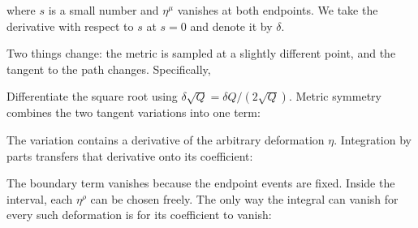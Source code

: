 \documentclass[
  11pt,
  letterpaper,
  oneside,
  openany]{scrbook}
\begin{document}
where \(s\) is a small number and \(\eta^\mu\) vanishes at both
endpoints. We take the derivative with respect to \(s\) at \(s=0\) and
denote it by \(\delta\).

Two things change: the metric is sampled at a slightly different point,
and the tangent to the path changes. Specifically,

\begin{center}
\begingroup
{}
\ifdim\wd\grmathbox>\linewidth
\resizebox{\linewidth}{!}{\usebox{\grmathbox}}
\else\usebox{\grmathbox}\fi
\endgroup
\end{center}

Differentiate the square root using
\(\delta\sqrt{Q}=\delta Q/(2\sqrt Q)\). Metric symmetry combines the two
tangent variations into one term:

\begin{center}
\begingroup
{}
\ifdim\wd\grmathbox>\linewidth
\resizebox{\linewidth}{!}{\usebox{\grmathbox}}
\else\usebox{\grmathbox}\fi
\endgroup
\end{center}

The variation contains a derivative of the arbitrary deformation
\(\eta\). Integration by parts transfers that derivative onto its
coefficient:

\begin{center}
\begingroup
{}
\ifdim\wd\grmathbox>\linewidth
\resizebox{\linewidth}{!}{\usebox{\grmathbox}}
\else\usebox{\grmathbox}\fi
\endgroup
\end{center}

The boundary term vanishes because the endpoint events are fixed. Inside
the interval, each \(\eta^\rho\) can be chosen freely. The only way the
integral can vanish for every such deformation is for its coefficient to
vanish:

\begin{center}
\begingroup
{}
\ifdim\wd\grmathbox>\linewidth
\resizebox{\linewidth}{!}{\usebox{\grmathbox}}
\else\usebox{\grmathbox}\fi
\endgroup
\end{center}
\end{document}

